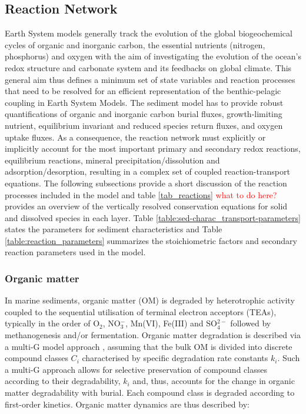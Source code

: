 \documentclass[gmd, manuscript]{copernicus}
\begin{document}
\subsection{Reaction Network}\label{subsec:ReactionNetwork}
Earth System models generally track the evolution of the global biogeochemical cycles of organic and inorganic carbon, the essential nutrients (nitrogen, phosphorus) and oxygen with the aim of investigating the evolution 
of the ocean's redox structure and carbonate system and its feedbacks on global climate. This general aim thus defines a minimum set of state variables and reaction processes that need to be resolved for an efficient 
representation of the benthic-pelagic coupling in Earth System Models. The sediment model has to provide robust quantifications of organic and inorganic carbon burial fluxes, growth-limiting nutrient, equilibrium invariant 
and reduced species return fluxes, and oxygen uptake fluxes. As a consequence, the reaction network must explicitly or implicitly account for the most important primary and secondary redox reactions, equilibrium reactions, 
mineral precipitation/dissolution and adsorption/desorption, resulting in a complex set of coupled reaction-transport equations. The following 
subsections provide a short discussion of the reaction processes included in the model and table \ref{tab_reactions} \textcolor{red}{what to do here?} provides an overview of the vertically resolved conservation equations for solid and dissolved species 
in each layer. Table \ref{table:sed-charac_transport-parameters} states the parameters for sediment characteristics and Table \ref{table:reaction_parameters} summarizes the stoichiometric factors and 
secondary reaction parameters used in the model.

\subsubsection{Organic matter}
In marine sediments, organic matter (OM) is degraded by heterotrophic activity coupled to the sequential utilisation of terminal electron acceptors (TEAs), typically in the order of O$_2$, NO$_3^-$, Mn(VI), Fe(III) and SO$_4^{2-}$ 
followed by methanogenesis and/or fermentation. Organic matter degradation is described via a multi-G model approach \citep[][and references therein]{arndt_quantifying_2013}, assuming that the bulk OM is divided 
into discrete compound classes $C_i$ characterised by specific degradation rate constants $k_i$. Such a multi-G approach allows for selective preservation of compound classes according to their degradability, $k_i$ and, thus, accounts 
for the change in organic matter degradability with burial. Each compound class is degraded according to first-order kinetics. Organic matter dynamics are thus described by:
\end{document}
